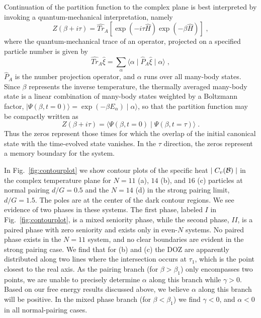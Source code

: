 \documentclass[rmp,aps,floatfix]{revtex4}
\begin{document}
Continuation of the partition function to the complex plane is best
interpreted by invoking a quantum-mechanical interpretation, namely
\begin{equation}
Z(\beta+i\tau)=\hat{Tr}_A\left[\exp\left(-i\tau\hat{H}\right)
\exp\left(-\beta\hat{H}\right)\right]\;,
\end{equation}
where the quantum-mechanical trace of an operator, projected on a
specified particle number is given by
\begin{equation}
\hat{Tr}_A\hat{\xi}=\sum_\alpha 
\langle\alpha\mid\hat{P}_A\hat{\xi}\mid\alpha\rangle\;,
\end{equation}
$\hat{P}_A$ is the number projection operator, and $\alpha$ runs
over all many-body states. Since $\beta$ represents the inverse
temperature, the thermally averaged many-body state is
a linear combination of many-body states weighted by a Boltzmann factor,
$\mid\Psi(\beta,t=0)\rangle=\exp(-\beta E_\alpha)\mid\alpha\rangle$, so 
that the partition function may be compactly written as
\begin{equation}
Z(\beta+i\tau)=\langle\Psi(\beta,t=0)\mid\Psi(\beta,t=\tau)\rangle\;.
\end{equation}
Thus the zeros represent those times for which the overlap of the 
initial canonical state with the time-evolved state vanishes. In the
$\tau$ direction, the zeros represent a memory boundary for the system.



In Fig.~\ref{fig:contourplot} we show contour 
plots of the specific heat $\mid C_v({\cal B})\mid $
in the complex temperature plane
for $N=11$ (a), $14$ (b), and $16$ (c) particles at normal 
pairing $d/G=0.5$ and
the $N=14$ (d) in the strong pairing limit, $d/G=1.5$. 
The poles are at the center of the dark contour regions.  We see evidence
of two phases in these systems. The first phase, labeled $I$ in 
Fig.~\ref{fig:contourplot}, is a mixed seniority phase, while the 
second phase, $II$, is a paired phase with zero seniority and exists
only in even-$N$ systems.  No paired phase exists in 
the $N=11$ system, and no clear boundaries are evident 
in the strong pairing case. We find that for (b) and (c) the 
DOZ are apparently distributed along two lines where the 
intersection occurs at $\tau_1$, which is the point closest to 
the real axis. As the pairing branch (for $\beta >\beta_1$) 
only encompasses two points, we are unable to precisely 
determine $\alpha$ along this branch while $\gamma>0$. Based on
our free energy results discussed above, we believe $\alpha$ 
along this branch will be positive. In the mixed phase branch
(for $\beta<\beta_1$) we find $\gamma<0$, and $\alpha < 0$ in
all normal-pairing cases. 
\end{document}
